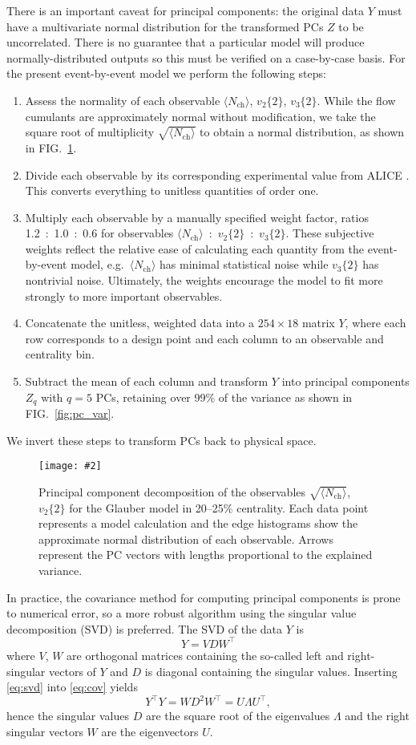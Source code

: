 \documentclass[aps,prc,reprint,superscriptaddress,amsmath]{revtex4-1}
\newcommand{\colfig}[3][t]{
  \begin{figure}[#1]
    \texttt{[image: \#2]}
    \caption{\label{fig:#2}#3}
  \end{figure}
}
\newcommand{\avg}[1]{\langle #1 \rangle}
\newcommand{\nch}{N_\text{ch}}
\newcommand{\vnk}[2]{v_#1\{#2\}}
\newcommand{\tran}{^\intercal}
\begin{document}
There is an important caveat for principal components:
the original data $Y$ must have a multivariate normal distribution for the transformed PCs $Z$ to be uncorrelated.
There is no guarantee that a particular model will produce normally-distributed outputs so this must be verified on a case-by-case basis.
For the present event-by-event model we perform the following steps:
\begin{enumerate}
  \item Assess the normality of each observable $\avg\nch$, $\vnk 2 2$, $\vnk 3 2$.
    While the flow cumulants are approximately normal without modification, we take the square root of multiplicity $\sqrt{\avg\nch}$ to obtain a normal distribution, as shown in FIG.~\ref{fig:pc_scatter}.
  \item Divide each observable by its corresponding experimental value from ALICE \cite{Abelev:2014mda}.
    This converts everything to unitless quantities of order one.
  \item Multiply each observable by a manually specified weight factor, ratios 1.2~:~1.0~:~0.6 for observables $\avg\nch$~:~$\vnk 2 2$~:~$\vnk 3 2$.
    These subjective weights reflect the relative ease of calculating each quantity from the event-by-event model, e.g.\ $\avg\nch$ has minimal statistical noise while $\vnk 3 2$ has nontrivial noise.
    Ultimately, the weights encourage the model to fit more strongly to more important observables.
  \item Concatenate the unitless, weighted data into a $254 \times 18$ matrix $Y$, where each row corresponds to a design point and each column to an observable and centrality bin.
  \item Subtract the mean of each column and transform $Y$ into principal components $Z_q$ with $q = 5$ PCs, retaining over 99\% of the variance as shown in FIG.~\ref{fig:pc_var}.
\end{enumerate}
We invert these steps to transform PCs back to physical space.

\colfig[b]{pc_scatter}{
  Principal component decomposition of the observables $\sqrt{\avg\nch}$, $\vnk 2 2$ for the Glauber model in 20--25\% centrality.
  Each data point represents a model calculation and the edge histograms show the approximate normal distribution of each observable.
  Arrows represent the PC vectors with lengths proportional to the explained variance.
}

In practice, the covariance method for computing principal components is prone to numerical error, so a more robust algorithm using the singular value decomposition (SVD) is preferred.
The SVD of the data $Y$ is
\begin{equation}
  Y = VDW\tran
  \label{eq:svd}
\end{equation}
where $V$, $W$ are orthogonal matrices containing the so-called left and right-singular vectors of $Y$ and $D$ is diagonal containing the singular values.
Inserting \eqref{eq:svd} into \eqref{eq:cov} yields
\begin{equation}
  Y\tran Y = W D^2 W\tran = U \Lambda U\tran,
\end{equation}
hence the singular values $D$ are the square root of the eigenvalues $\Lambda$ and the right singular vectors $W$ are the eigenvectors $U$.
\end{document}
